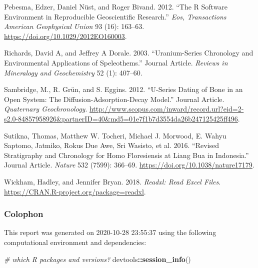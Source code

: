\documentclass[]{elsarticle} %
\newenvironment{Shaded}{\begin{snugshade}}{\end{snugshade}}
\newcommand{\CommentTok}[1]{\textcolor[rgb]{0.56,0.35,0.01}{\textit{#1}}}
\newcommand{\KeywordTok}[1]{\textcolor[rgb]{0.13,0.29,0.53}{\textbf{#1}}}
\newcommand{\NormalTok}[1]{#1}
\newcommand{\OperatorTok}[1]{\textcolor[rgb]{0.81,0.36,0.00}{\textbf{#1}}}
\newlength{\cslhangindent}
\newenvironment{cslreferences}%
  {\setlength{\parindent}{0pt}%
  \everypar{\setlength{\hangindent}{\cslhangindent}}\ignorespaces}%
  {\par}
\begin{document}
\begin{cslreferences}
\leavevmode\hypertarget{ref-Pebesma_Nust_Bivand_2012}{}%
Pebesma, Edzer, Daniel Nüst, and Roger Bivand. 2012. ``The R Software Environment in Reproducible Geoscientific Research.'' \emph{Eos, Transactions American Geophysical Union} 93 (16): 163--63. \url{https://doi.org/10.1029/2012EO160003}.

\leavevmode\hypertarget{ref-RN4494}{}%
Richards, David A, and Jeffrey A Dorale. 2003. ``Uranium-Series Chronology and Environmental Applications of Speleothems.'' Journal Article. \emph{Reviews in Mineralogy and Geochemistry} 52 (1): 407--60.

\leavevmode\hypertarget{ref-Sambridge2012}{}%
Sambridge, M., R. Grün, and S. Eggins. 2012. ``U-Series Dating of Bone in an Open System: The Diffusion-Adsorption-Decay Model.'' Journal Article. \emph{Quaternary Geochronology}. \url{http://www.scopus.com/inward/record.url?eid=2-s2.0-84857958926\&partnerID=40\&md5=01e7f1b7d3554da26b247125425ff496}.

\leavevmode\hypertarget{ref-Sutikna2016}{}%
Sutikna, Thomas, Matthew W. Tocheri, Michael J. Morwood, E. Wahyu Saptomo, Jatmiko, Rokus Due Awe, Sri Wasisto, et al. 2016. ``Revised Stratigraphy and Chronology for Homo Floresiensis at Liang Bua in Indonesia.'' Journal Article. \emph{Nature} 532 (7599): 366--69. \url{https://doi.org/10.1038/nature17179}.

\leavevmode\hypertarget{ref-Wickham_readxl}{}%
Wickham, Hadley, and Jennifer Bryan. 2018. \emph{Readxl: Read Excel Files}. \url{https://CRAN.R-project.org/package=readxl}.
\end{cslreferences}

\newpage

\hypertarget{colophon}{%
\subsubsection{Colophon}\label{colophon}}

This report was generated on 2020-10-28 23:55:37 using the following computational environment and dependencies:

\begin{Shaded}
\begin{Highlighting}[]
\CommentTok{\# which R packages and versions?}
\NormalTok{devtools}\OperatorTok{::}\KeywordTok{session\_info}\NormalTok{()}
\end{Highlighting}
\end{Shaded}
\end{document}
